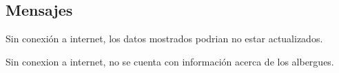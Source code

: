 \subsection{Mensajes}

\begin{Citemize}
	\item Sin conexión a internet, los datos mostrados podrian no estar actualizados.
	\item Sin conexion a internet, no se cuenta con información acerca de los albergues.
\end{Citemize}

\clearpage